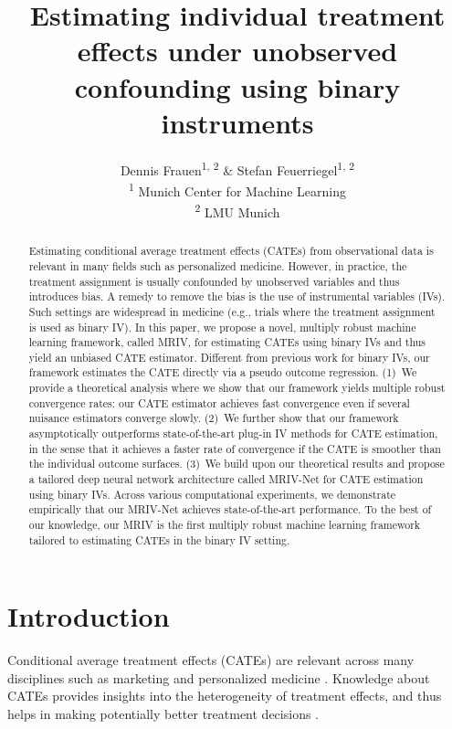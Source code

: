 \documentclass{article} %
\title{Estimating individual treatment effects under unobserved confounding using binary instruments}
\author{Dennis Frauen\textsuperscript{\rm 1, 2} \& Stefan Feuerriegel\textsuperscript{\rm 1, 2} \\
\textsuperscript{\rm 1} Munich Center for Machine Learning\\
\textsuperscript{\rm 2} LMU Munich
}
\newcommand{\frameworkname}{MRIV\xspace}
\newcommand{\modelname}{\mbox{MRIV-Net}\xspace}
\theoremstyle{definition}
\theoremstyle{plain}
\begin{document}
\maketitle

\begin{abstract}
Estimating conditional average treatment effects (CATEs) from observational data is relevant in many fields such as personalized medicine. However, in practice, the treatment assignment is usually confounded by unobserved variables and thus introduces bias. A remedy to remove the bias is the use of instrumental variables (IVs). Such settings are widespread in medicine (e.g., trials where the treatment assignment is used as binary IV). In this paper, we propose a novel, multiply robust machine learning framework, called \frameworkname, for estimating CATEs using binary IVs and thus yield an unbiased CATE estimator. Different from previous work for binary IVs, our framework estimates the CATE directly via a pseudo outcome regression. (1)~We provide a theoretical analysis where we show that our framework yields multiple robust convergence rates: our CATE estimator achieves fast convergence even if several nuisance estimators converge slowly. (2)~We further show that our framework asymptotically outperforms state-of-the-art plug-in IV methods for CATE estimation, in the sense that it achieves a faster rate of convergence if the CATE is smoother than the individual outcome surfaces. (3)~We build upon our theoretical results and propose a tailored deep neural network architecture called \modelname for CATE estimation using binary IVs. Across various computational experiments, we demonstrate empirically that our \modelname achieves state-of-the-art performance. To the best of our knowledge, our \frameworkname is the first multiply robust machine learning framework tailored to estimating CATEs in the binary IV setting. 
\end{abstract}


\section{Introduction}


Conditional average treatment effects (CATEs) are relevant across many disciplines such as marketing \citep{Varian.2016} and personalized medicine \citep{Yazdani.2015}. Knowledge about CATEs provides insights into the heterogeneity of treatment effects, and thus helps in making potentially better treatment decisions \citep{Frauen.2022b}. 
\end{document}
